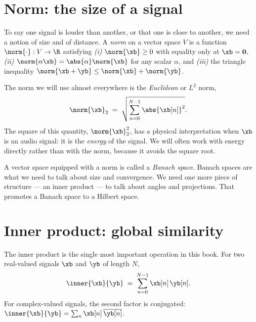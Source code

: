 \section{Norm: the size of a signal}

To say one signal is louder than another, or that one is close to
another, we need a notion of size and of distance.  A \emph{norm} on a
vector space $V$ is a function $\norm{\cdot}: V \to \R$ satisfying
\emph{(i)} $\norm{\xb} \ge 0$ with equality only at $\xb = \mathbf{0}$,
\emph{(ii)} $\norm{\alpha \xb} = \abs{\alpha} \norm{\xb}$ for any scalar
$\alpha$, and \emph{(iii)} the triangle inequality $\norm{\xb + \yb} \le
\norm{\xb} + \norm{\yb}$.

The norm we will use almost everywhere is the \emph{Euclidean} or
\emph{$L^2$} norm,
\begin{equation}
    \norm{\xb}_2 \;=\; \sqrt{\sum_{n=0}^{N-1} \abs{\xb[n]}^2}.
    \label{eq:l2norm}
\end{equation}
The square of this quantity, $\norm{\xb}_2^2$, has a physical
interpretation when $\xb$ is an audio signal: it is the \emph{energy} of
the signal.  We will often work with energy directly rather than with
the norm, because it avoids the square root.


A vector space equipped with a norm is called a \emph{Banach space}.
Banach spaces are what we need to talk about size and convergence.  We
need one more piece of structure --- an inner product --- to talk about
angles and projections.  That promotes a Banach space to a Hilbert space.

\section{Inner product: global similarity}

The inner product is the single most important operation in this book.
For two real-valued signals $\xb$ and $\yb$ of length $N$,
\begin{equation}
    \inner{\xb}{\yb} \;=\; \sum_{n=0}^{N-1} \xb[n]\, \yb[n].
    \label{eq:inner}
\end{equation}
For complex-valued signals, the second factor is conjugated:
$\inner{\xb}{\yb} = \sum_n \xb[n]\, \overline{\yb[n]}$.


